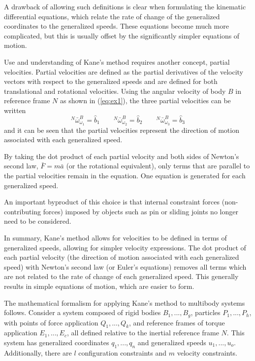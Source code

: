 \documentclass[smallcondensed,final]{svjour3}                     %
\begin{document}
A drawback of allowing such definitions is clear when formulating the kinematic
differential equations, which relate the rate of change of the generalized
coordinates to the generalized speeds.
These equations become much more complicated, but this is usually offset by the
significantly simpler equations of motion.

Use and understanding of Kane's method requires another concept, partial
velocities.
Partial velocities are defined as the partial derivatives of the velocity
vectors with respect to the generalized speeds and are defined for both
translational and rotational velocities.
Using the angular velocity of body $B$ in reference frame $N$ as shown in
(\ref{eq:ex1}), the three partial velocities can be written
\[
{^N}\bar{\omega}^B_{\omega_1} = \hat{b}_1 \quad \quad
{^N}\bar{\omega}^B_{\omega_2} = \hat{b}_2 \quad \quad
{^N}\bar{\omega}^B_{\omega_3} = \hat{b}_3
\]
and it can be seen that the partial velocities represent the direction of
motion associated with each generalized speed.

By taking the dot product of each partial velocity and both sides of Newton's
second law, $\bar{F}=m\bar{a}$ (or the rotational equivalent), only terms that
are parallel to the partial velocities remain in the equation.
One equation is generated for each generalized speed.

An important byproduct of this choice is that internal constraint forces
(non-contributing forces) imposed by objects such as pin or sliding joints
no longer need to be considered.

In summary, Kane's method allows for velocities to be defined in terms of
generalized speeds, allowing for simpler velocity expressions.
The dot product of each partial velocity (the direction of motion associated
with each generalized speed) with Newton's second law (or Euler's equations)
removes all terms which are not related to the rate of change of each
generalized speed.
This generally results in simple equations of motion, which are easier to form.

The mathematical formalism for applying Kane's method to multibody systems
follows.
Consider a system composed of rigid bodies $B_1,...,B_g$, particles
$P_1,...,P_h$, with points of force application $Q_1,...,Q_k$, and reference
frames of torque application $E_1,...,E_c$, all defined relative to the
inertial reference frame $N$.
This system has generalized coordinates $q_1,...,q_n$ and generalized speeds
$u_1,...,u_o$.
Additionally, there are $l$ configuration constraints and $m$ velocity
constraints.
\end{document}
